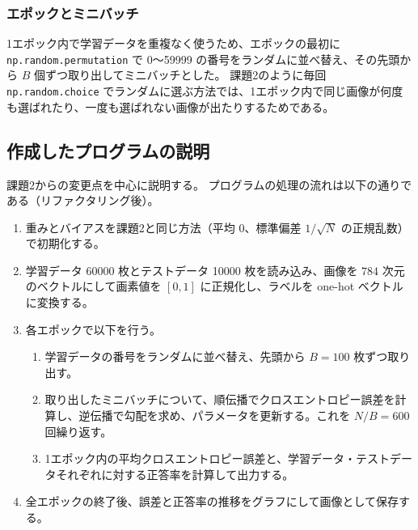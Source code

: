 \documentclass[a4paper,11pt]{ltjsarticle}
\begin{document}
\subsubsection{エポックとミニバッチ}
1エポック内で学習データを重複なく使うため、エポックの最初に \texttt{np.random.permutation} で 0～59999 の番号をランダムに並べ替え、その先頭から $B$ 個ずつ取り出してミニバッチとした。
課題2のように毎回 \texttt{np.random.choice} でランダムに選ぶ方法では、1エポック内で同じ画像が何度も選ばれたり、一度も選ばれない画像が出たりするためである。

\subsection{作成したプログラムの説明}
課題2からの変更点を中心に説明する。
プログラムの処理の流れは以下の通りである（リファクタリング後）。
\begin{enumerate}
  \item 重みとバイアスを課題2と同じ方法（平均 0、標準偏差 $1/\sqrt{N}$ の正規乱数）で初期化する。
  \item 学習データ 60000 枚とテストデータ 10000 枚を読み込み、画像を $784$ 次元のベクトルにして画素値を $[0, 1]$ に正規化し、ラベルを one-hot ベクトルに変換する。
  \item 各エポックで以下を行う。
  \begin{enumerate}
    \item 学習データの番号をランダムに並べ替え、先頭から $B = 100$ 枚ずつ取り出す。
    \item 取り出したミニバッチについて、順伝播でクロスエントロピー誤差を計算し、逆伝播で勾配を求め、パラメータを更新する。これを $N/B = 600$ 回繰り返す。
    \item 1エポック内の平均クロスエントロピー誤差と、学習データ・テストデータそれぞれに対する正答率を計算して出力する。
  \end{enumerate}
  \item 全エポックの終了後、誤差と正答率の推移をグラフにして画像として保存する。
\end{enumerate}
\end{document}
